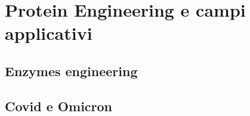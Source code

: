 \chapter{Protein Engineering e campi applicativi}
\section{Enzymes engineering}
\section{Covid e Omicron}

\clearpage